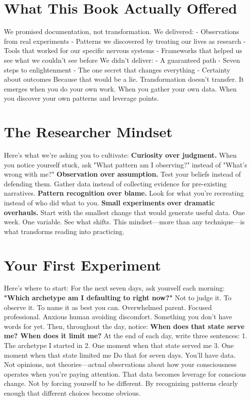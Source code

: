 \documentclass[12pt,openany]{book}
\begin{document}
\section{What This Book Actually Offered}

We promised documentation, not transformation.
We delivered:
- Observations from real experiments
- Patterns we discovered by treating our lives as research
- Tools that worked for our specific nervous systems
- Frameworks that helped us see what we couldn't see before
We didn't deliver:
- A guaranteed path
- Seven steps to enlightenment
- The one secret that changes everything
- Certainty about outcomes
Because that would be a lie.
Transformation doesn't transfer. It emerges when you do your own work. When you gather your own data. When you discover your own patterns and leverage points.

\section{The Researcher Mindset}

Here's what we're asking you to cultivate:
\textbf{Curiosity over judgment.} When you notice yourself stuck, ask "What pattern am I observing?" instead of "What's wrong with me?"
\textbf{Observation over assumption.} Test your beliefs instead of defending them. Gather data instead of collecting evidence for pre-existing narratives.
\textbf{Pattern recognition over blame.} Look for what you're recreating instead of who did what to you.
\textbf{Small experiments over dramatic overhauls.} Start with the smallest change that would generate useful data. One week. One variable. See what shifts.
This mindset—more than any technique—is what transforms reading into practicing.

\section{Your First Experiment}

Here's where to start:
For the next seven days, ask yourself each morning: \textbf{"Which archetype am I defaulting to right now?"}
Not to judge it. To observe it. To name it as best you can.
Overwhelmed parent. Focused professional. Anxious human avoiding discomfort. Something you don't have words for yet.
Then, throughout the day, notice: \textbf{When does that state serve me? When does it limit me?}
At the end of each day, write three sentences:
1. The archetype I started in
2. One moment when that state served me
3. One moment when that state limited me
Do that for seven days.
You'll have data. Not opinions, not theories—actual observations about how your consciousness operates when you're paying attention.
That data becomes leverage for conscious change. Not by forcing yourself to be different. By recognizing patterns clearly enough that different choices become obvious.
\end{document}
